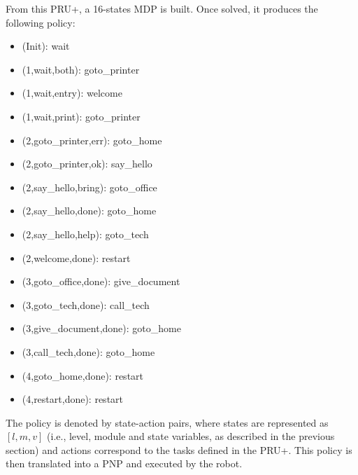 From this PRU+, a 16-states MDP is built. %
Once solved, it produces the following policy:
\begin{multicols}{2}
  \begin{small}
    \begin{itemize}
    \item (Init): wait
    \item (1,wait,both): goto\_printer
    \item (1,wait,entry): welcome
    \item (1,wait,print): goto\_printer
    \item (2,goto\_printer,err): goto\_home
    \item (2,goto\_printer,ok): say\_hello
    \item (2,say\_hello,bring): goto\_office
    \item (2,say\_hello,done): goto\_home
    \item (2,say\_hello,help): goto\_tech
    \item (2,welcome,done): restart
    \item (3,goto\_office,done): give\_document
    \item (3,goto\_tech,done): call\_tech
    \item (3,give\_document,done): goto\_home
    \item (3,call\_tech,done): goto\_home
    \item (4,goto\_home,done): restart
    \item (4,restart,done): restart
    \end{itemize}
  \end{small}
\end{multicols}

The policy is denoted by state-action pairs, where states are represented as 
$[l, m, v]$ (i.e., level, module and state variables, as described in the previous section) and actions correspond to the tasks defined in the PRU+.
This policy is then translated into a PNP and executed by the robot.


